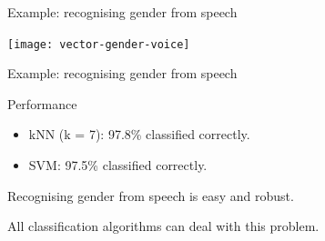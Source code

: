 \documentclass[compress]{beamer}
\begin{document}
\begin{frame}{Example: recognising gender from speech}

    \begin{center}
        \texttt{[image: vector-gender-voice]}
    \end{center}
\end{frame}

\begin{frame}{Example: recognising gender from speech}

Performance

\begin{itemize}

\item kNN (k = 7): 97.8\% classified correctly.
\item SVM: 97.5\% classified correctly.
\end{itemize}

Recognising gender from speech is easy and robust.

All classification algorithms can deal with this problem.

\end{frame}
\end{document}
